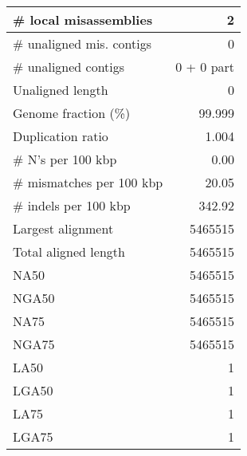 \documentclass[12pt,a4paper]{article}
\begin{document}
\begin{table}[ht]
\begin{center}
\begin{tabular}{|l*{1}{|r}|}
\# local misassemblies & 2 \\ \hline
\# unaligned mis. contigs & 0 \\ \hline
\# unaligned contigs & 0 + 0 part \\ \hline
Unaligned length & 0 \\ \hline
Genome fraction (\%) & 99.999 \\ \hline
Duplication ratio & 1.004 \\ \hline
\# N's per 100 kbp & 0.00 \\ \hline
\# mismatches per 100 kbp & 20.05 \\ \hline
\# indels per 100 kbp & 342.92 \\ \hline
Largest alignment & 5465515 \\ \hline
Total aligned length & 5465515 \\ \hline
NA50 & 5465515 \\ \hline
NGA50 & 5465515 \\ \hline
NA75 & 5465515 \\ \hline
NGA75 & 5465515 \\ \hline
LA50 & 1 \\ \hline
LGA50 & 1 \\ \hline
LA75 & 1 \\ \hline
LGA75 & 1 \\ \hline
\end{tabular}
\end{center}
\end{table}
\end{document}
